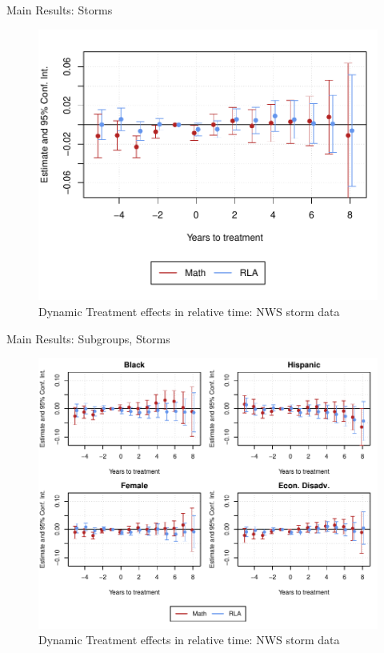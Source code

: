 \documentclass[hyperref={colorlinks = true,linkcolor = blue, citecolor=blue,urlcolor=blue}]{beamer}
\begin{document}
\begin{frame}{Main Results: Storms}
	\begin{figure}[!h]
		\centering
		\includegraphics[scale=0.6]{"../Code & Data/ResultsPlotStormsPresentation.pdf"}
		\caption{Dynamic Treatment effects in relative time: NWS storm data}
	\end{figure}
\end{frame}


\begin{frame}{Main Results: Subgroups, Storms}
	\begin{figure}[!h]
		\centering
		\includegraphics[scale=0.6]{"../Code & Data/ResultsPlotStormsPresentationSubgroups.pdf"}
		\caption{Dynamic Treatment effects in relative time: NWS storm data}
	\end{figure}
\end{frame}
\end{document}
